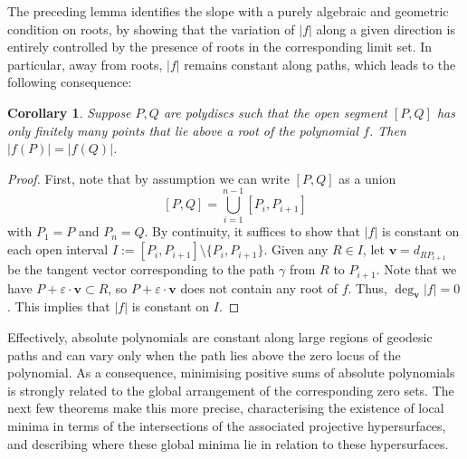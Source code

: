 \documentclass[10pt]{article}
\newtheorem{corollary}[theorem]{Corollary}
\theoremstyle{definition}
\renewcommand{\vec}[1]{\mathbf{#1}}
\begin{document}
The preceding lemma identifies the slope with a purely algebraic and geometric condition on roots, by showing that the variation of $|f|$ along a given direction is entirely controlled by the presence of roots in the corresponding limit set.  In particular, away from roots, $|f|$ remains constant along paths, which leads to the following consequence: 

\begin{corollary} \label{cor:constantIfNoRootsPath}
    Suppose $P, Q$ are polydiscs such that the open segment $[P, Q]$ has only finitely many points that lie above a root of the polynomial $f$. Then $\lvert f(P) \rvert = \lvert f(Q) \rvert$. 
\end{corollary}

\begin{proof}
    First, note that by assumption we can write $[P, Q]$ as a union
    $$
        [P, Q] = \bigcup_{i=1}^{n-1} [P_i, P_{i+1}]
    $$
    with $P_1=P$ and $P_n = Q$.
    By continuity, it suffices to show that $\lvert f \rvert$ is constant on each open interval $I := [P_i, P_{i+1}] \setminus \{P_i, P_{i+1}\}$.
    Given any $R \in I$, let $\vec{v} = d_{RP_{i+1}}$ be the tangent vector corresponding to the path $\gamma$ from $R$ to $P_{i+1}$. Note that we have
    $P + \varepsilon \cdot \mathbf{v} \subset R$, so $P + \varepsilon \cdot \mathbf{v}$ does not contain any root of $f$. Thus, $\deg_{\vec{v}} |f| = 0$. This implies that $\lvert f \rvert$ is constant on $I$.
\end{proof}

Effectively, absolute polynomials are constant along large regions of geodesic paths and can vary only when the path lies above the zero locus of the polynomial. As a consequence, minimising positive sums of absolute polynomials is strongly related to the global arrangement of the corresponding zero sets. The next few theorems make this more precise, characterising the existence of local minima in terms of the intersections of the associated projective hypersurfaces, and describing where these global minima lie in relation to these hypersurfaces.
\end{document}

